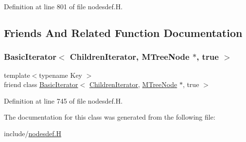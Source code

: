 Definition at line 801 of file nodesdef.\+H.



\subsection{Friends And Related Function Documentation}
\mbox{\label{class_designar_1_1_m_tree_node_1_1_children_iterator_a9318ecb15aa59102557883ca0b98fea5}} 
\subsubsection{\texorpdfstring{Basic\+Iterator$<$ Children\+Iterator, M\+Tree\+Node $\ast$, true $>$}{BasicIterator< ChildrenIterator, MTreeNode *, true >}}
{\footnotesize\ttfamily template$<$typename Key $>$ \\
friend class \hyperlink{class_designar_1_1_basic_iterator}{Basic\+Iterator}$<$ \hyperlink{class_designar_1_1_m_tree_node_1_1_children_iterator}{Children\+Iterator}, \hyperlink{class_designar_1_1_m_tree_node}{M\+Tree\+Node} $\ast$, true $>$\hspace{0.3cm}{\ttfamily [friend]}}



Definition at line 745 of file nodesdef.\+H.



The documentation for this class was generated from the following file\+:\begin{DoxyCompactItemize}
\item 
include/\hyperlink{nodesdef_8_h}{nodesdef.\+H}\end{DoxyCompactItemize}
